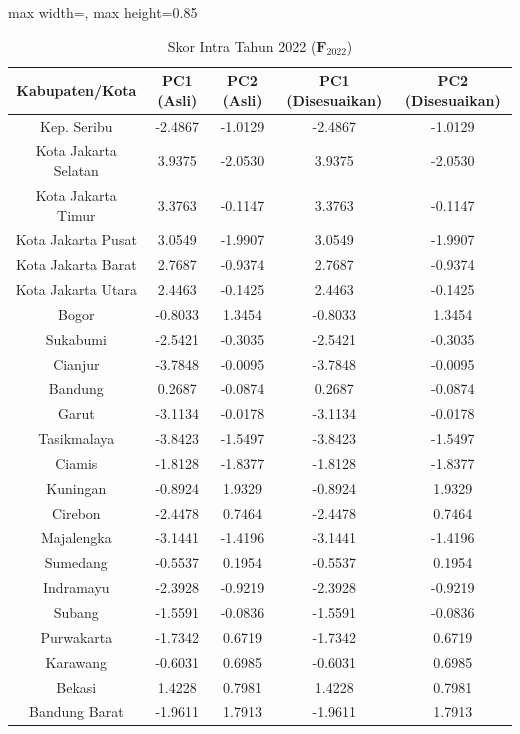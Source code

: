\begin{table}[H]
\centering
\caption{Skor Intra Tahun 2022 ($\mathbf{F}_{2022}$)} \label{tab:app1skor_intra_2022}
\begin{adjustbox}{max width=\textwidth, max height=0.85\textheight}
\begin{tabular}{|c|c|c|c|c|}
\hline
\textbf{Kabupaten/Kota} & \textbf{PC1 (Asli)} & \textbf{PC2 (Asli)} & \textbf{PC1 (Disesuaikan)} & \textbf{PC2 (Disesuaikan)} \\
\hline
Kep. Seribu & -2.4867 & -1.0129 & -2.4867 & -1.0129 \\
Kota Jakarta Selatan & 3.9375 & -2.0530 & 3.9375 & -2.0530 \\
Kota Jakarta Timur & 3.3763 & -0.1147 & 3.3763 & -0.1147 \\
Kota Jakarta Pusat & 3.0549 & -1.9907 & 3.0549 & -1.9907 \\
Kota Jakarta Barat & 2.7687 & -0.9374 & 2.7687 & -0.9374 \\
Kota Jakarta Utara & 2.4463 & -0.1425 & 2.4463 & -0.1425 \\
Bogor & -0.8033 & 1.3454 & -0.8033 & 1.3454 \\
Sukabumi & -2.5421 & -0.3035 & -2.5421 & -0.3035 \\
Cianjur & -3.7848 & -0.0095 & -3.7848 & -0.0095 \\
Bandung & 0.2687 & -0.0874 & 0.2687 & -0.0874 \\
Garut & -3.1134 & -0.0178 & -3.1134 & -0.0178 \\
Tasikmalaya & -3.8423 & -1.5497 & -3.8423 & -1.5497 \\
Ciamis & -1.8128 & -1.8377 & -1.8128 & -1.8377 \\
Kuningan & -0.8924 & 1.9329 & -0.8924 & 1.9329 \\
Cirebon & -2.4478 & 0.7464 & -2.4478 & 0.7464 \\
Majalengka & -3.1441 & -1.4196 & -3.1441 & -1.4196 \\
Sumedang & -0.5537 & 0.1954 & -0.5537 & 0.1954 \\
Indramayu & -2.3928 & -0.9219 & -2.3928 & -0.9219 \\
Subang & -1.5591 & -0.0836 & -1.5591 & -0.0836 \\
Purwakarta & -1.7342 & 0.6719 & -1.7342 & 0.6719 \\
Karawang & -0.6031 & 0.6985 & -0.6031 & 0.6985 \\
Bekasi & 1.4228 & 0.7981 & 1.4228 & 0.7981 \\
Bandung Barat & -1.9611 & 1.7913 & -1.9611 & 1.7913 \\

\end{tabular}
\end{adjustbox}
\end{table}
